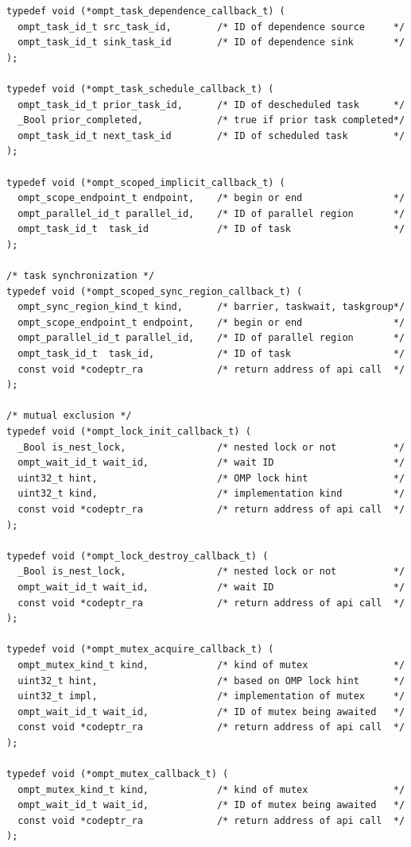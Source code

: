 \documentclass{article}
\begin{document}
\begin{verbatim}
typedef void (*ompt_task_dependence_callback_t) (
  ompt_task_id_t src_task_id,        /* ID of dependence source     */
  ompt_task_id_t sink_task_id        /* ID of dependence sink       */
);

typedef void (*ompt_task_schedule_callback_t) (
  ompt_task_id_t prior_task_id,      /* ID of descheduled task      */
  _Bool prior_completed,             /* true if prior task completed*/
  ompt_task_id_t next_task_id        /* ID of scheduled task        */
);

typedef void (*ompt_scoped_implicit_callback_t) ( 
  ompt_scope_endpoint_t endpoint,    /* begin or end                */
  ompt_parallel_id_t parallel_id,    /* ID of parallel region       */
  ompt_task_id_t  task_id            /* ID of task                  */
);

/* task synchronization */
typedef void (*ompt_scoped_sync_region_callback_t) ( 
  ompt_sync_region_kind_t kind,      /* barrier, taskwait, taskgroup*/
  ompt_scope_endpoint_t endpoint,    /* begin or end                */ 
  ompt_parallel_id_t parallel_id,    /* ID of parallel region       */
  ompt_task_id_t  task_id,           /* ID of task                  */
  const void *codeptr_ra             /* return address of api call  */
);

/* mutual exclusion */
typedef void (*ompt_lock_init_callback_t) (
  _Bool is_nest_lock,                /* nested lock or not          */
  ompt_wait_id_t wait_id,            /* wait ID                     */
  uint32_t hint,                     /* OMP lock hint               */
  uint32_t kind,                     /* implementation kind         */
  const void *codeptr_ra             /* return address of api call  */
);

typedef void (*ompt_lock_destroy_callback_t) (
  _Bool is_nest_lock,                /* nested lock or not          */
  ompt_wait_id_t wait_id,            /* wait ID                     */
  const void *codeptr_ra             /* return address of api call  */
);

typedef void (*ompt_mutex_acquire_callback_t) ( 
  ompt_mutex_kind_t kind,            /* kind of mutex               */
  uint32_t hint,                     /* based on OMP lock hint      */
  uint32_t impl,                     /* implementation of mutex     */
  ompt_wait_id_t wait_id,            /* ID of mutex being awaited   */
  const void *codeptr_ra             /* return address of api call  */          
);

typedef void (*ompt_mutex_callback_t) ( 
  ompt_mutex_kind_t kind,            /* kind of mutex               */ 
  ompt_wait_id_t wait_id,            /* ID of mutex being awaited   */
  const void *codeptr_ra             /* return address of api call  */          
);


\end{verbatim}
\end{document}

